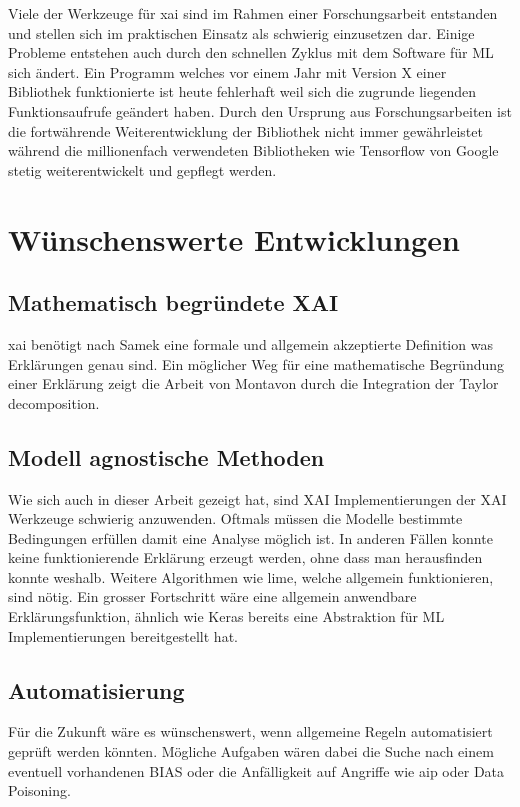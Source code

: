 \documentclass[
  12pt, %
  a4paper, %
  oneside, %
  openany, 
  numbers=noenddot, %
  BCOR=5mm, %
  parskip=half*, %
  thesis, %
]{bfhbook}
\begin{document}
Viele der Werkzeuge für \Gls{xai} sind im Rahmen einer Forschungsarbeit entstanden und stellen sich im praktischen Einsatz als schwierig einzusetzen dar. Einige Probleme entstehen auch durch den schnellen Zyklus mit dem Software für \Gls{ML} sich ändert. Ein Programm welches vor einem Jahr mit Version X einer Bibliothek funktionierte ist heute fehlerhaft weil sich die zugrunde liegenden Funktionsaufrufe geändert haben. Durch den Ursprung aus Forschungsarbeiten ist die fortwährende Weiterentwicklung der Bibliothek nicht immer gewährleistet während die millionenfach verwendeten Bibliotheken wie Tensorflow von Google stetig weiterentwickelt und gepflegt werden.

\section{Wünschenswerte Entwicklungen}

\subsection{Mathematisch begründete XAI}
\Gls{xai} benötigt nach Samek \parencite{Samek2019a} eine formale und allgemein akzeptierte Definition was Erklärungen genau sind.
Ein möglicher Weg für eine mathematische Begründung einer Erklärung zeigt die Arbeit von Montavon \parencite{Montavon2017} durch die Integration der Taylor decomposition.

\subsection{Modell agnostische Methoden}
Wie sich auch in dieser Arbeit gezeigt hat, sind \acrshort{XAI} Implementierungen der XAI Werkzeuge schwierig anzuwenden. Oftmals müssen die Modelle bestimmte Bedingungen erfüllen damit eine Analyse möglich ist. In anderen Fällen konnte keine funktionierende Erklärung erzeugt werden, ohne dass man herausfinden konnte weshalb. Weitere Algorithmen wie \acrshort{lime}, welche allgemein funktionieren, sind nötig. Ein grosser Fortschritt wäre eine allgemein anwendbare Erklärungsfunktion, ähnlich wie Keras bereits eine Abstraktion für \Gls{ML} Implementierungen bereitgestellt hat. 

\subsection{Automatisierung}
Für die Zukunft wäre es wünschenswert, wenn allgemeine Regeln automatisiert geprüft werden könnten. Mögliche Aufgaben wären dabei die Suche nach einem eventuell vorhandenen \Gls{BIAS} oder die Anfälligkeit auf Angriffe wie \acrlong{aip} oder Data Poisoning.
\end{document}
